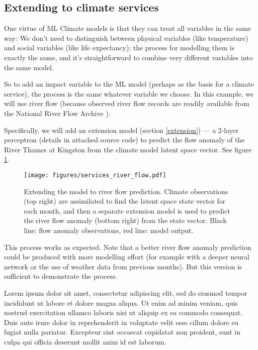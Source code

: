 \documentclass[gmd]{copernicus}
\begin{document}
\subsection{Extending to climate services}

One virtue of ML Climate models is that they can treat all variables in the same way: We don't need to distinguish between physical variables (like temperature) and social variables (like life expectancy); the process for modelling them is exactly the same, and it's straightforward to combine very different variables into the same model.

So to add an impact variable to the ML model (perhaps as the basis for a climate service), the process is the same whatever variable we choose. In this example, we will use river flow (because observed river flow records are readily available from the National River Flow Archive \citep{NRFA}).

Specifically, we will add an extension model (section \ref{extension}) --- a 2-layer perceptron (details in attached source code) to predict the flow anomaly of the River Thames at Kingston \citep{NRFA-Kingston} from the climate model latent space vector. See figure \ref{services_river_flow}.

\begin{figure}[h]
\texttt{[image: figures/services\_river\_flow.pdf]}
\caption{Extending the model to river flow prediction. Climate observations (top right) are assimilated to find the latent space state vector for each month, and then a separate extension model is used to predict the river flow anomaly (bottom right) from the state vector. Black line: flow anomaly observations, red line: model output.}
\label{services_river_flow}
\end{figure}
         
This process works as expected. Note that a better river flow anomaly prediction could be produced with more modelling effort (for example with a deeper neural network or the use of weather data from previous months). But this version is sufficient to demonstrate the process.


\conclusions  %


Lorem ipsum dolor sit amet, consectetur adipiscing elit, sed do eiusmod tempor incididunt ut labore et dolore magna aliqua. Ut enim ad minim veniam, quis nostrud exercitation ullamco laboris nisi ut aliquip ex ea commodo consequat. Duis aute irure dolor in reprehenderit in voluptate velit esse cillum dolore eu fugiat nulla pariatur. Excepteur sint occaecat cupidatat non proident, sunt in culpa qui officia deserunt mollit anim id est laborum.
\end{document}
